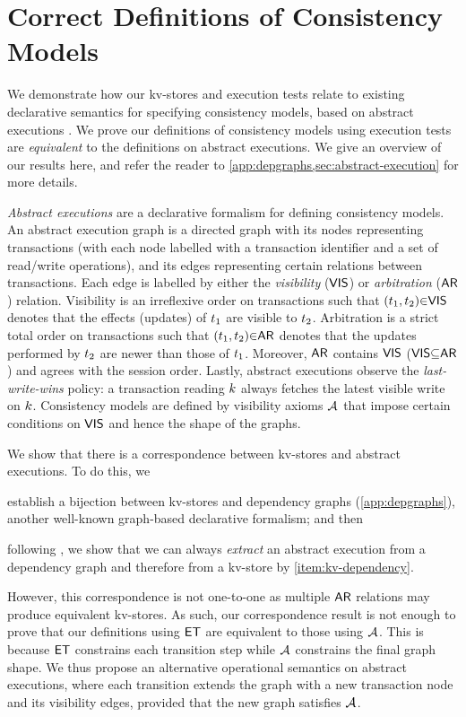 \section{Correct Definitions of Consistency Models}
\label{sec:other_formalisms}

We demonstrate how our kv-stores and execution 
tests relate to existing declarative semantics for specifying  
consistency models, based on abstract executions \cite{framework-concur}. 
We prove our definitions of consistency models using execution tests
are \emph{equivalent} to the definitions on abstract executions.
We give an overview of our results here, and refer the reader to \cref{app:depgraphs,sec:abstract-execution}
for more details.

\emph{Abstract executions} \cite{ev_transactions,framework-concur} are a declarative formalism for defining consistency models. 
An abstract execution graph is a directed graph with its nodes representing transactions 
(with each node labelled with a transaction identifier and a set of read/write operations), 
and its edges representing certain relations between transactions. 
Each edge is labelled by either the \emph{visibility} ($\mathsf{VIS}$) or \emph{arbitration} ($\mathsf{AR}$) relation. 
Visibility is an irreflexive order on transactions such that $(t_1,t_2) {\in} \mathsf{VIS}$ denotes that the effects (updates) of $t_1$ are visible to $t_2$. 
Arbitration is a strict total order on transactions such that $(t_1,t_2) {\in} \mathsf{AR}$ denotes that the updates performed by $t_2$ are newer than those of $t_1$. 
Moreover, $\mathsf{AR}$ contains $\mathsf{VIS}$ ($\mathsf{VIS} {\subseteq} \mathsf{AR}$) and agrees with the session order.
Lastly, abstract executions observe the \emph{last-write-wins} policy: 
a transaction reading $k$ always fetches the latest visible write on $k$.
Consistency models are defined by visibility axioms \( \visaxioms\) 
that impose certain conditions on $\mathsf{VIS}$ and hence the shape of the graphs.

We show that there is a correspondence between kv-stores and abstract executions.
To do this, we 
\begin{enumerate*}
	\item establish a bijection between kv-stores and dependency graphs (\cref{app:depgraphs}),
	\label{item:kv-dependency}
another well-known graph-based declarative formalism; and then
	\item following \cite{laws}, we show that we can always \emph{extract} an abstract execution from a dependency graph and therefore from a kv-store by \ref{item:kv-dependency}. 
\end{enumerate*}
However, this correspondence is not one-to-one 
as multiple $\mathsf{AR}$ relations may produce equivalent kv-stores.
As such, our correspondence result is not enough to prove that 
our definitions using \( \mathsf{ET} \) are equivalent to those using \( \visaxioms \).
This is because \( \mathsf{ET} \) constrains each transition step while \( \visaxioms\) constrains the final graph shape.
We thus propose an alternative operational semantics on abstract executions,
where each transition extends the graph with a 
new transaction node and its visibility edges, 
provided that the new graph satisfies \( \visaxioms \).

